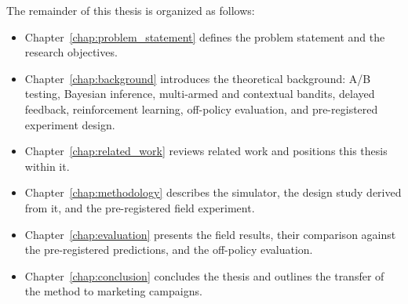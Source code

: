 \vspace{1.0cm}

The remainder of this thesis is organized as follows:

\begin{itemize}
    \item Chapter~\ref{chap:problem_statement} defines the problem statement and the research objectives.
    \item Chapter~\ref{chap:background} introduces the theoretical background: A/B testing, Bayesian inference, multi-armed and contextual bandits, delayed feedback, reinforcement learning, off-policy evaluation, and pre-registered experiment design.
    \item Chapter~\ref{chap:related_work} reviews related work and positions this thesis within it.
    \item Chapter~\ref{chap:methodology} describes the simulator, the design study derived from it, and the pre-registered field experiment.
    \item Chapter~\ref{chap:evaluation} presents the field results, their comparison against the pre-registered predictions, and the off-policy evaluation.
    \item Chapter~\ref{chap:conclusion} concludes the thesis and outlines the transfer of the method to marketing campaigns.
\end{itemize}

